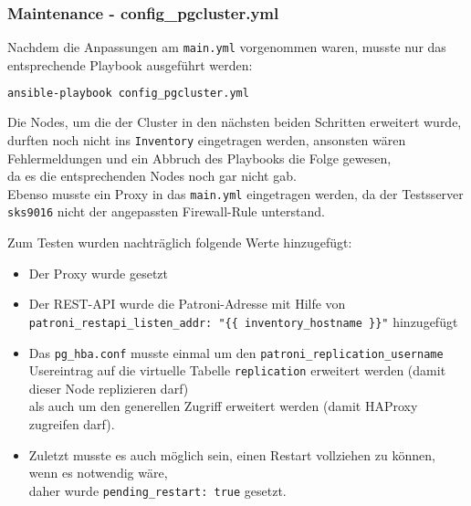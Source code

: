 \begin{flushleft}
    \subsubsection{Maintenance - config\_pgcluster.yml}
    Nachdem die Anpassungen am \texttt{main.yml} vorgenommen waren, musste nur das entsprechende Playbook ausgeführt werden:
    \lstset{style=gra_codestyle}
    \begin{lstlisting}[language=bash, caption=Maintenance - config\_pgcluster.yml,captionpos=b,label={lst:config-pgcluster},breaklines=true]
ansible-playbook config_pgcluster.yml
    \end{lstlisting}
    \begin{warning}
        Die Nodes, um die der Cluster in den nächsten beiden Schritten erweitert wurde,\\
        durften noch nicht ins \texttt{Inventory} eingetragen werden, ansonsten wären Fehlermeldungen und ein Abbruch des Playbooks die Folge gewesen,\\da es die entsprechenden Nodes noch gar nicht gab.\\
        Ebenso musste ein Proxy in das \texttt{main.yml} eingetragen werden, da der Testsserver \texttt{sks9016} nicht der angepassten Firewall-Rule unterstand.
    \end{warning}
\begin{flushleft}
    Zum Testen wurden nachträglich folgende Werte hinzugefügt:
    \begin{itemize}
        \item Der Proxy wurde gesetzt
        \item Der REST-API wurde die Patroni-Adresse mit Hilfe von \texttt{patroni\_restapi\_listen\_addr: "\{\{ inventory\_hostname \}\}"} hinzugefügt
        \item Das \texttt{pg\_hba.conf} musste einmal um den \texttt{patroni\_replication\_username} Usereintrag auf die virtuelle Tabelle \texttt{replication} erweitert werden (damit dieser Node replizieren darf)\\als auch um den generellen Zugriff erweitert werden (damit \Gls{HAProxy} zugreifen darf).
        \item Zuletzt musste es auch möglich sein, einen Restart vollziehen zu können, wenn es notwendig wäre,\\daher wurde \texttt{pending\_restart: true} gesetzt.
    \end{itemize}
\end{flushleft}

\end{flushleft}
